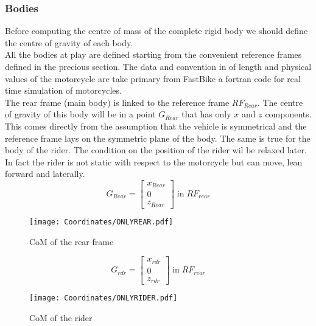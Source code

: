\subsubsection{Bodies}
%
Before computing the centre of mass of the complete rigid body we should define the centre of gravity of each body.\\
All the bodies at play are defined starting from the convenient reference frames defined in the precious section. The data  and convention in of length and physical values of the motorcycle are take primary from FastBike a fortran code for real time simulation of motorcycles.\cite{cossalter2002motorcycle,cossalter2003multibody}\\
The rear frame (main body) is linked to the reference frame $RF_{Rear}$. The centre of gravity of this body will be in a point $G_{Rear}$ that has only $x$ and $z$ components. This comes directly from the assumption that the vehicle is symmetrical and the reference frame lays on the symmetric plane of the body. The same is true for the body of the rider. The condition on the position of the rider wil be relaxed later. In fact the rider is not static with respect to the motorcycle but can move, lean forward and laterally.
%
\begin{equation}
    G_{Rear} =
    \left[
    \begin{array}{c}
        x_{Rear}\\
        0\\
        z_{Rear}
    \end{array}
    \right]
    \; \text{in} \; RF_{rear}
\end{equation}
%
\begin{figure}[h!]
    \centering
    \texttt{[image: Coordinates/ONLYREAR.pdf]}
    \caption{CoM of the rear frame}
    \label{fig:CoMRear}
\end{figure}
%
\begin{equation}
    G_{rdr} =
    \left[
    \begin{array}{c}
        x_{rdr}\\
        0\\
        z_{rdr}
    \end{array}
    \right]
    \; \text{in} \; RF_{rear}
\end{equation}
%
\begin{figure}[h!]
    \centering
    \texttt{[image: Coordinates/ONLYRIDER.pdf]}
    \caption{CoM of the rider}
    \label{fig:CoMrdr}
\end{figure}
